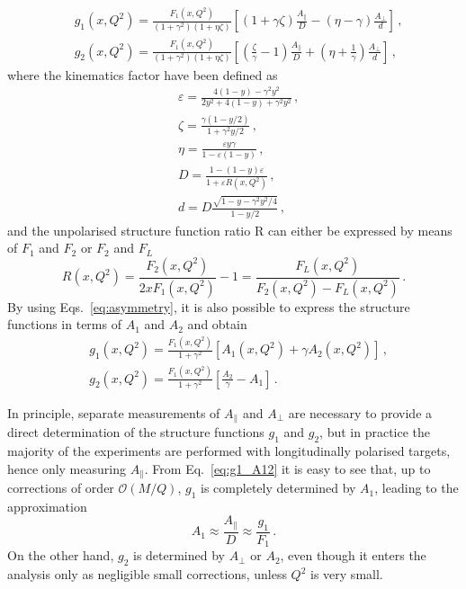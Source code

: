\begin{align}
  & g_1(x,Q^2) = \frac{F_1(x,Q^2)}{(1+\gamma^2)(1 + \eta \zeta)} \left[ (1 + \gamma \zeta) \frac{A_{\parallel}}{D} - (\eta - \gamma) \frac{A_{\perp}}{d} \right] \,, \\
  & g_2(x,Q^2) = \frac{F_1 (x, Q^2)}{(1 + \gamma^2)(1 + \eta \zeta)} \left[ \left( \frac{\zeta}{\gamma} - 1 \right) \frac{A_{\parallel}}{D} + (\eta + \frac{1}{\gamma}) \frac{A_{\perp}}{d} \right] \,,
\end{align}
where the kinematics factor have been defined as 
\begin{align}
  & \varepsilon = \frac{4(1-y) - \gamma^2 y^2}{2 y^2 + 4(1-y) + \gamma^2 y^2} \,,\\
  & \zeta = \frac{\gamma(1 - y/2)}{1 + \gamma^2y/2} \,,\\
  & \eta = \frac{\varepsilon y \gamma}{1 - \varepsilon(1 - y)} \,,\\
  & D = \frac{1 - (1 - y)\varepsilon }{1 + \varepsilon R (x,Q^2)} \,,\\
  & d = D \frac{\sqrt{1 - y - \gamma^2 y^2 /4}}{1 - y/2}\,,
\end{align}
and the unpolarised structure function ratio R can either be expressed by means of $F_1$ and $F_2$ or $F_2$ and $F_{L}$
\begin{equation}
  R(x, Q^2) = \frac{F_2(x,Q^2)}{2 x F_1 (x, Q^2)} - 1 = \frac{F_{L}(x,Q^2)}{F_2 (x,Q^2) - F_{L}(x,Q^2)}\,.
\end{equation}
By using Eqs.~\eqref{eq:asymmetry}, it is also possible to express the structure functions in terms of $A_1$ and $A_2$ and obtain
\begin{align}
  & g_1(x,Q^2) = \frac{F_1 (x,Q^2)}{1 + \gamma^2} \left[ A_1(x,Q^2) + \gamma A_2 (x,Q^2) \right] \,,
  \label{eq:g1_A12}\\
  & g_2(x,Q^2) = \frac{F_1 (x,Q^2)}{1 + \gamma^2} \left[ \frac{A_2}{\gamma} - A_1 \right] \,.
\end{align}
\par
In principle, separate measurements of $A_{\parallel}$ and $A_{\perp}$ are necessary to provide a direct determination of the structure functions $g_1$ and $g_2$, but in practice the majority of the experiments are performed with longitudinally polarised targets, hence only measuring $A_{\parallel}$. From Eq.~\eqref{eq:g1_A12} it is easy to see that, up to corrections of order $\mathcal{O}(M/Q)$, $g_1$ is completely determined by $A_1$, leading to the approximation
\begin{equation}
  A_1 \approx \frac{A_{\parallel}}{D} \approx \frac{g_1}{F_1}\,.
  \label{eq:A1}
\end{equation}
On the other hand, $g_2$ is determined by $A_{\perp}$ or $A_2$, even though it enters the analysis only as negligible small corrections, unless $Q^2$ is very small. 

